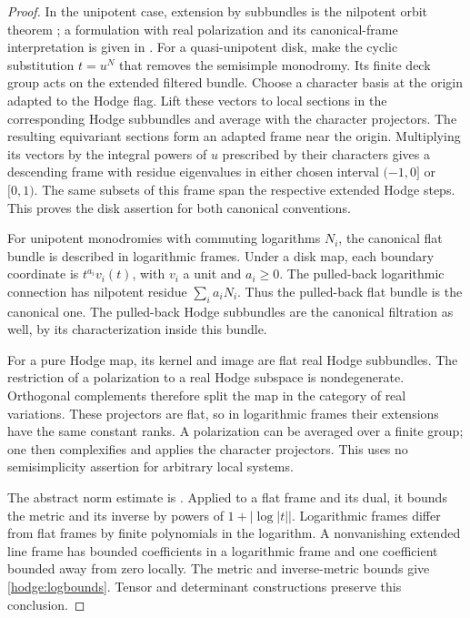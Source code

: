 \begin{proof}
In the unipotent case, extension by subbundles is the nilpotent orbit theorem
\cite[Theorem~4.12]{Schmid73}; a formulation with real polarization
and its canonical-frame interpretation is given in
\cite[Section~2, \((2.1)\)--\((2.2)\)]{CK89}.
For a quasi-unipotent disk, make the cyclic substitution \(t=u^N\)
that removes the semisimple monodromy.  Its finite deck group acts
on the extended filtered bundle.  Choose a character basis at the
origin adapted to the Hodge flag.  Lift these vectors to local
sections in the corresponding Hodge subbundles and average with
the character projectors.  The resulting equivariant sections
form an adapted frame near the origin.  Multiplying its vectors
by the integral powers of \(u\) prescribed by their characters
gives a descending frame with residue eigenvalues in either chosen
interval \((-1,0]\) or \([0,1)\).  The same subsets of this frame
span the respective extended Hodge steps.  This proves the disk
assertion for both canonical conventions.

For unipotent monodromies with commuting logarithms \(N_i\), the
canonical flat bundle is described in logarithmic frames.  Under a
disk map, each boundary coordinate is \(t^{a_i}v_i(t)\), with \(v_i\)
a unit and \(a_i\geq0\).  The pulled-back logarithmic connection has
nilpotent residue \(\sum_i a_iN_i\).  Thus the pulled-back flat bundle
is the canonical one.  The pulled-back Hodge subbundles are the
canonical filtration as well, by its characterization inside this
bundle.

For a pure Hodge map, its kernel and image are flat real Hodge
subbundles.  The restriction of a polarization to a real Hodge
subspace is nondegenerate.  Orthogonal complements therefore split
the map in the category of real variations.  These projectors are
flat, so in logarithmic frames their extensions have the same
constant ranks.  A polarization can be averaged over a finite group;
one then complexifies and applies the character projectors.
This uses no semisimplicity assertion for arbitrary local systems.

The abstract norm estimate is
\cite[Theorem~\(6.6'\)]{Schmid73}.  Applied to a flat frame and its
dual, it bounds the metric and its inverse by powers of
\(1+|\log|t||\).  Logarithmic frames differ from flat frames by finite
polynomials in the logarithm.  A nonvanishing extended line frame
has bounded coefficients in a logarithmic frame and one coefficient
bounded away from zero locally.  The metric and inverse-metric bounds
give \eqref{hodge:logbounds}.  Tensor and determinant constructions
preserve this conclusion.
\end{proof}


